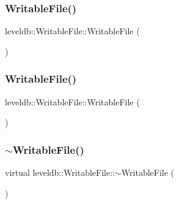 \subsubsection{\texorpdfstring{WritableFile()}{WritableFile()}\hspace{0.1cm}{\footnotesize\ttfamily [1/2]}}
{\footnotesize\ttfamily leveldb\+::\+Writable\+File\+::\+Writable\+File (\begin{DoxyParamCaption}{ }\end{DoxyParamCaption})\hspace{0.3cm}{\ttfamily [default]}}

\mbox{\label{classleveldb_1_1_writable_file_afda8e9b2d4783258701f556cd82dd22c}} 
\subsubsection{\texorpdfstring{WritableFile()}{WritableFile()}\hspace{0.1cm}{\footnotesize\ttfamily [2/2]}}
{\footnotesize\ttfamily leveldb\+::\+Writable\+File\+::\+Writable\+File (\begin{DoxyParamCaption}\item[{const \mbox{\hyperlink{classleveldb_1_1_writable_file}{Writable\+File}} \&}]{ }\end{DoxyParamCaption})\hspace{0.3cm}{\ttfamily [delete]}}

\mbox{\label{classleveldb_1_1_writable_file_a98027e2f2e97b75b189eefa47e5bf4a1}} 
\subsubsection{\texorpdfstring{$\sim$WritableFile()}{~WritableFile()}}
{\footnotesize\ttfamily virtual leveldb\+::\+Writable\+File\+::$\sim$\+Writable\+File (\begin{DoxyParamCaption}{ }\end{DoxyParamCaption})\hspace{0.3cm}{\ttfamily [virtual]}}



